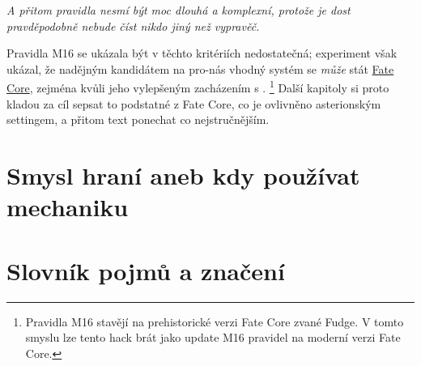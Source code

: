 \documentclass[../main.tex]{subfiles}
\begin{document}
\textit{A přitom pravidla nesmí být moc dlouhá a komplexní, protože je dost pravděpodobně nebude číst nikdo jiný než vypravěč.}

Pravidla M16 se ukázala být v těchto kritériích nedostatečná; experiment však ukázal, že nadějným kandidátem na pro-nás vhodný systém se \textit{může} stát \href{https://fate.nepocitacovehry.cz/?do=StahniFC}{Fate Core}, zejména kvůli jeho vylepšeným zacházením s . \footnote{Pravidla M16 stavějí na prehistorické verzi Fate Core zvané Fudge. V tomto smyslu lze tento hack brát jako update M16 pravidel na moderní verzi Fate Core.} Další kapitoly si proto kladou za cíl sepsat to podstatné z Fate Core, co je ovlivněno asterionským settingem, a přitom text ponechat co nejstručnějším. 

\section{Smysl hraní aneb kdy používat mechaniku}
\label{sec:proc}



\section{Slovník pojmů a značení}
\label{sec:slovnik}
\end{document}
